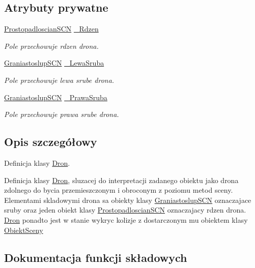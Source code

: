 \subsection*{Atrybuty prywatne}
\begin{DoxyCompactItemize}
\item 
\hyperlink{classProstopadloscianSCN}{Prostopadloscian\+S\+CN} \hyperlink{classDron_af62e07b9d016168d5a129515f65f1609}{\+\_\+\+Rdzen}
\begin{DoxyCompactList}\small\item\em Pole przechowuje rdzen drona. \end{DoxyCompactList}\item 
\hyperlink{classGraniastoslupSCN}{Graniastoslup\+S\+CN} \hyperlink{classDron_a16ece01f1022ab49f1017f010db254b1}{\+\_\+\+Lewa\+Sruba}
\begin{DoxyCompactList}\small\item\em Pole przechowuje lewa srube drona. \end{DoxyCompactList}\item 
\hyperlink{classGraniastoslupSCN}{Graniastoslup\+S\+CN} \hyperlink{classDron_abcf5121c081a80ec44fbfe1de9784f1d}{\+\_\+\+Prawa\+Sruba}
\begin{DoxyCompactList}\small\item\em Pole przechowuje prawa srube drona. \end{DoxyCompactList}\end{DoxyCompactItemize}


\subsection{Opis szczegółowy}
Definicja klasy \hyperlink{classDron}{Dron}. 

Definicja klasy \hyperlink{classDron}{Dron}, sluzacej do interpretacji zadanego obiektu jako drona zdolnego do bycia przemieszczonym i obroconym z poziomu metod sceny. Elementami skladowymi drona sa obiekty klasy \hyperlink{classGraniastoslupSCN}{Graniastoslup\+S\+CN} oznaczajace sruby oraz jeden obiekt klasy \hyperlink{classProstopadloscianSCN}{Prostopadloscian\+S\+CN} oznaczajacy rdzen drona. \hyperlink{classDron}{Dron} ponadto jest w stanie wykryc kolizje z dostarczonym mu obiektem klasy \hyperlink{classObiektSceny}{Obiekt\+Sceny} 

\subsection{Dokumentacja funkcji składowych}
\mbox{\label{classDron_ac0c17bd50d8f7c11457ab69cb2237abb}} 
